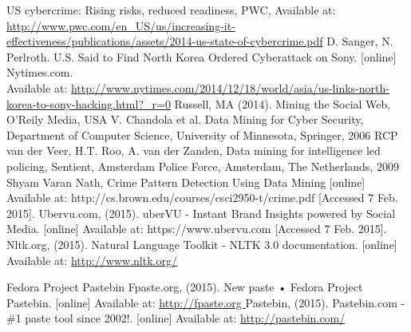 \documentclass[12pt]{article}
\begin{document}
\begin{thebibliography}{99}
US cybercrime: Rising risks, reduced readiness, PWC, Available at: \url{http://www.pwc.com/en_US/us/increasing-it-effectiveness/publications/assets/2014-us-state-of-cybercrime.pdf}
	 D. Sanger, N. Perlroth.  U.S. Said to Find North Korea Ordered Cyberattack on Sony. [online] Nytimes.com. \\Available at: \url{http://www.nytimes.com/2014/12/18/world/asia/us-links-north-korea-to-sony-hacking.html?_r=0}
  Russell, MA (2014). Mining the Social Web, O'Reily Media, USA
    V. Chandola et al. Data Mining for Cyber Security, Department of Computer Science, University of Minnesota, Springer, 2006
   RCP van der Veer, H.T. Roo,  A. van der Zanden, Data mining for intelligence led policing, Sentient, Amsterdam Police Force, Amsterdam, The Netherlands, 2009
Shyam Varan Nath, Crime Pattern Detection Using Data Mining [online] Available at: http://cs.brown.edu/courses/csci2950-t/crime.pdf [Accessed 7 Feb. 2015].
Ubervu.com, (2015). uberVU - Instant Brand Insights powered by Social Media. [online] Available at: https://www.ubervu.com [Accessed 7 Feb. 2015].
Nltk.org, (2015). Natural Language Toolkit - NLTK 3.0 documentation. [online] Available at: \url{http://www.nltk.org/}

Fedora Project Pastebin Fpaste.org, (2015). New paste • Fedora Project Pastebin. [online] Available at:  
\url{http://fpaste.org }
Pastebin, (2015). Pastebin.com - \#1 paste tool since 2002!. [online] Available at:     \url{http://pastebin.com/}


\end{thebibliography}
\end{document}
